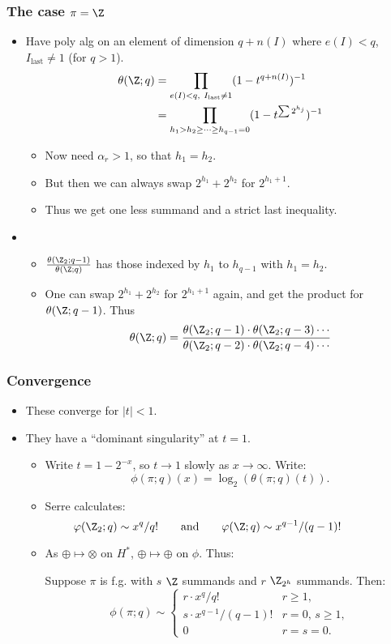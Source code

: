 \documentclass[11pt]{article}
\begin{document}
\begin{SerreCohModTwoEilMacLane}
\subsubsection*{The case $\pi=\Z$}
\begin{itemize}\squishlist
\item Have poly alg on an element of dimension $q+n(I)$ where $e(I)<q$, $I_\text{last}\neq1$ (for $q>1$).
\begin{align*}
\theta(\Z;q)&=\mathop{\prod_{e(I)<q,\ I_\text{last}\neq1}}(1-t^{q+n(I)})^{-1}\\
&=\prod_{h_1> h_2\geq\cdots\geq h_{q-1}=0}(1-t^{\sum2^{h_j}})^{-1}
\end{align*}
\begin{itemize}\squishlist
\item Now need $\alpha_r>1$, so that $h_1=h_2$.
\item But then we can always swap $2^{h_1}+2^{h_2}$ for $2^{h_1+1}$.
\item Thus we get one less summand and a strict last inequality.
\end{itemize}
\item
\begin{itemize}\squishlist
\item $\frac{\theta(\Z_2;q-1)}{\theta(\Z;q)}$ has those indexed by $h_1$ to $h_{q-1}$ with $h_1=h_2$.
\item One can swap $2^{h_1}+2^{h_2}$ for $2^{h_1+1}$ again, and get the product for $\theta(\Z;q-1)$. Thus
\[\theta(\Z;q)=\frac{\theta(\Z_2;q-1)\cdot\theta(\Z_2;q-3)\cdots}{\theta(\Z_2;q-2)\cdot\theta(\Z_2;q-4)\cdots}\]
\end{itemize}
\end{itemize}
\pagebreak
\subsubsection*{Convergence}
\begin{itemize}\squishlist
\item These converge for $|t|<1$.
\item They have a ``dominant singularity'' at $t=1$.
\begin{itemize}\squishlist
\item Write $t=1-2^{-x}$, so $t\to1$ slowly as $x\to\infty$. Write:
\[\phi(\pi;q)(x)=\log_2(\theta(\pi;q)(t)).\]
\item Serre calculates:
\[\phi(\Z_2;q)\sim x^q/q!\text{\qquad and\qquad}\phi(\Z;q)\sim x^{q-1}/(q-1)!\qquad\qquad\]
\item As $\oplus\mapsto\otimes$ on $H^*$, $\oplus\mapsto\oplus$ on $\phi$. Thus:
\begin{thm*}
Suppose $\pi$ is f.g. with $s$ $\Z$ summands and $r$ $\Z_{2^h}$ summands. Then:
\[\phi(\pi;q)\sim \begin{cases}
r\cdot x^q/q! & r\geq1,\\
s\cdot x^{q-1}/(q-1)! & r=0,\,s\geq1,\\
0& r=s=0.
\end{cases}\]
\end{thm*}
\end{itemize}
\end{itemize}

\end{SerreCohModTwoEilMacLane}
\end{document}
